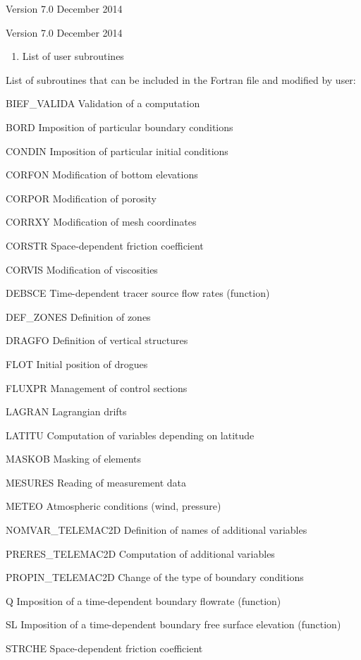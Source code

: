  Version 7.0 December 2014

 Version 7.0 December 2014

\begin{enumerate}
\item   List of user subroutines
\end{enumerate}

 List of subroutines that can be included in the Fortran file and modified by user:



 BIEF\_VALIDA Validation of a computation

 BORD Imposition of particular boundary conditions

 CONDIN Imposition of particular initial conditions

 CORFON Modification of bottom elevations

 CORPOR Modification of porosity

 CORRXY Modification of mesh coordinates

 CORSTR Space-dependent friction coefficient

 CORVIS Modification of viscosities

 DEBSCE Time-dependent tracer source flow rates (function)

 DEF\_ZONES Definition of zones

 DRAGFO Definition of vertical structures

 FLOT Initial position of drogues

 FLUXPR Management of control sections

 LAGRAN Lagrangian drifts

 LATITU Computation of variables depending on latitude

 MASKOB Masking of elements

 MESURES Reading of measurement data

 METEO Atmospheric conditions (wind, pressure)

 NOMVAR\_TELEMAC2D Definition of names of additional variables

 PRERES\_TELEMAC2D Computation of additional variables

 PROPIN\_TELEMAC2D Change of the type of boundary conditions

 Q Imposition of a time-dependent boundary flowrate (function)

 SL Imposition of a time-dependent boundary free surface elevation (function)

 STRCHE Space-dependent friction coefficient


